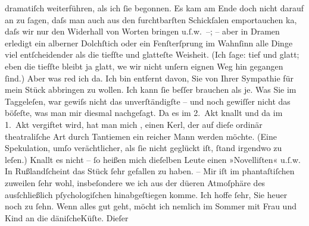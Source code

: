 \begin{ledgroupsized}[t]{13cm}
               dramatiſch weiterführen, als ich ſie begonnen. Es kam am Ende doch nicht darauf an zu
               ſagen, daſs man auch aus den furchtbarſten Schickſalen emportauchen ka{\geminationn}, daſs wir nur den Widerhall von Worten bringen
               u.ſ.w. –; – aber in Dramen erledigt ein alberner Dolchſtich {\pb}oder ein Fenſterſprung im Wahnſinn alle Dinge viel
               entſcheidender als die tiefſte und glatteſte Weisheit. (Ich ſage: tief und glatt;
               eben die tiefſte bleibt ja glatt, we{\geminationn} wir nicht unſern
               eignen Weg hin gegangen ſind.) Aber was red ich da. Ich bin entfernt davon, Sie von
               Ihrer Sympathie für mein Stück abbringen zu wollen. Ich kann ſie beſſer brauchen als
               je. Was Sie im Taggeleſen, war {\pb}gewiſs nicht das unverſtändigſte – und noch
               gewiſſer nicht das böſeſte, was man mir diesmal nachgeſagt. Da es im 2. Akt knallt
               und da im 1. Akt vergiftet wird, hat man mich \label{K_L01590_1v}\label{K_L01590_1h}, einen Kerl, der auf dieſe ordinär
               theatraliſche Art durch Tantiemen ein reicher Mann werden möchte. (Eine Spekulation,
               umſo verächtlicher, als ſie nicht geglückt iſt, ſtand irgendwo zu {\pb}leſen.) Knallt es nicht – ſo heißen mich dieſelben
               Leute einen »Novelliſten« u.ſ.w. In Rußlandſcheint das Stück ſehr gefallen zu haben. – Mir iſt
               im phantaſtiſchen zuweilen ſehr wohl, insbeſondere we{\geminationn}
               ich aus der dü{\geminationn}eren Atmoſphäre des ausſchließlich
               pſychologiſchen hinabgeſtiegen komme.\pend
           \pstart
           Ich hoffe ſehr, Sie heuer noch zu ſehn. Wenn alles gut geht, möcht ich nemlich im
               Sommer mit Frau und Kind an die däniſcheKüſte. Dieſer \label{K_L01590_2v}
\end{ledgroupsized}
